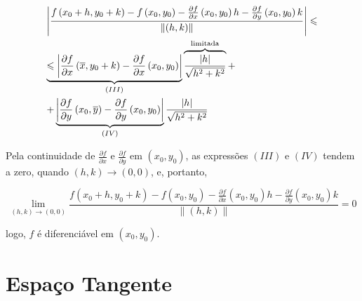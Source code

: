 \documentclass{book}
\begin{document}
\begin{dem}
\[
\begin{gathered}
  \left| {\frac{{f\left( {x_0  + h,y_0  + k} \right) - f\left( {x_0 ,y_0 } \right) - \frac{{\partial f}}
{{\partial x}}\left( {x_0 ,y_0 } \right)h - \frac{{\partial f}}
{{\partial y}}\left( {x_0 ,y_0 } \right)k}}
{{\left\| {\left( {h,k} \right)} \right\|}}} \right| \leqslant  \hfill \\
\underbrace { \leqslant \left| {\frac{{\partial f}}
{{\partial x}}\left( {\overline x ,y_0  + k} \right) - \frac{{\partial f}}
{{\partial x}}\left( {x_0 ,y_0 } \right)} \right|}_{\left( {III} \right)}\overbrace {\frac{{\left| h \right|}}
{{\sqrt {h^2  + k^2 } }}}^{{\text{limitada}}} +  \hfill \\
+ \underbrace {\left| {\frac{{\partial f}}
{{\partial y}}\left( {x_0 ,\overline y } \right) - \frac{{\partial f}}
{{\partial y}}\left( {x_0 ,y_0 } \right)} \right|}_{\left( {IV} \right)}\frac{{\left| h \right|}}
{{\sqrt {h^2  + k^2 } }} \hfill \\
\end{gathered}
\]

    Pela continuidade de $\frac{{\partial f}}{{\partial x}}$ e $\frac{{\partial f}}{{\partial y}}$ em $\left( {x_0 ,y_0 } \right)$, as express\~oes $(III)$ e $(IV)$ tendem a zero, quando $\left( {h,k} \right) \to \left( {0,0} \right)$, e, portanto,

\[
\mathop {\lim }\limits_{\left( {h,k} \right) \to \left( {0,0} \right)} \frac{{f\left( {x_0  + h,y_0  + k} \right) - f\left( {x_0 ,y_0 } \right) - \frac{{\partial f}}
{{\partial x}}\left( {x_0 ,y_0 } \right)h - \frac{{\partial f}}
{{\partial y}}\left( {x_0 ,y_0 } \right)k}}
{{\left\| {\left( {h,k} \right)} \right\|}} = 0
\]

logo, $f$ \'e diferenci\'avel em $\left( {x_0 ,y_0 } \right)$.

\end{dem}

\section{Espa\c co Tangente} \label{sec15}
\end{document}
